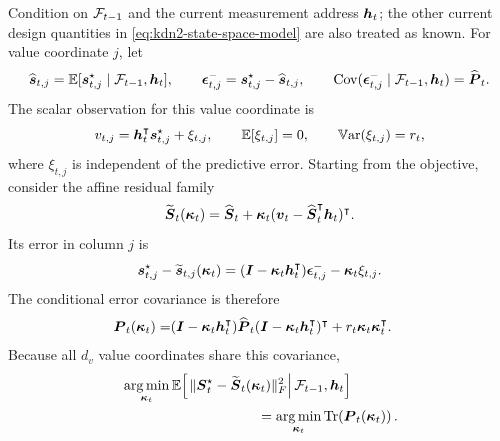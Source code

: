 \documentclass[11pt,letterpaper,logo]{yalearxiv}
\begin{document}
Condition on $\mathcal F_{t-1}$ and the current measurement address $\boldsymbol{h}_t$; the other current design
quantities in \eqref{eq:kdn2-state-space-model} are also treated as known. For value coordinate
$j$, let
\begin{equation}
  \widehat{\boldsymbol{s}}_{t,j}
  =
  \mathbb{E}[\boldsymbol{s}_{t,j}^\star\mid\mathcal F_{t-1},\boldsymbol{h}_t],
  \qquad
  \boldsymbol{\epsilon}_{t,j}^-
  =
  \boldsymbol{s}_{t,j}^\star-\widehat{\boldsymbol{s}}_{t,j},
  \qquad
  \operatorname{Cov}(\boldsymbol{\epsilon}_{t,j}^-\mid\mathcal F_{t-1},\boldsymbol{h}_t)
  =
  \widehat{\boldsymbol{P}}_t.
  \label{eq:app-kdn2-predictive-error}
\end{equation}
The scalar observation for this value coordinate is
\begin{equation}
  v_{t,j}
  =
  \boldsymbol{h}_t^{\intercal}\boldsymbol{s}_{t,j}^\star+\xi_{t,j},
  \qquad
  \mathbb{E}[\xi_{t,j}]=0,
  \qquad
  \mathbb{V}\text{ar}(\xi_{t,j})=r_t,
  \label{eq:app-kdn2-scalar-observation}
\end{equation}
where $\xi_{t,j}$ is independent of the predictive error. Starting from the objective, consider
the affine residual family
\begin{equation}
  \widetilde{\boldsymbol{S}}_t(\boldsymbol{\kappa}_t)
  =
  \widehat{\boldsymbol{S}}_t
  +
  \boldsymbol{\kappa}_t
  (\boldsymbol{v}_t-\widehat{\boldsymbol{S}}_t^{\intercal}\boldsymbol{h}_t)^{\intercal}.
  \label{eq:app-kdn2-candidate-estimator}
\end{equation}
Its error in column $j$ is
\begin{equation}
  \boldsymbol{s}_{t,j}^\star
  -
  \widetilde{\boldsymbol{s}}_{t,j}(\boldsymbol{\kappa}_t)
  =
  (\boldsymbol{I}-\boldsymbol{\kappa}_t\boldsymbol{h}_t^{\intercal})
  \boldsymbol{\epsilon}_{t,j}^-
  -
  \boldsymbol{\kappa}_t\xi_{t,j}.
  \label{eq:app-kdn2-candidate-error}
\end{equation}
The conditional error covariance is therefore
\begin{equation}
\begin{aligned}
  \boldsymbol{P}_t(\boldsymbol{\kappa}_t)
  =
  &(\boldsymbol{I}-\boldsymbol{\kappa}_t\boldsymbol{h}_t^{\intercal})
   \widehat{\boldsymbol{P}}_t
   (\boldsymbol{I}-\boldsymbol{\kappa}_t\boldsymbol{h}_t^{\intercal})^{\intercal}
  +r_t\boldsymbol{\kappa}_t\boldsymbol{\kappa}_t^{\intercal}.
\end{aligned}
\label{eq:app-kdn2-candidate-covariance}
\end{equation}
Because all $d_v$ value coordinates share this covariance,
\begin{equation}
\begin{aligned}
  &\argmin_{\ve{\kappa}_t}
  \E\!\left[
    \left.
    \|\ve{S}_t^\star-
      \widetilde{\ve{S}}_t(\ve{\kappa}_t)\|_F^2
    \right|
    \mc F_{t-1},\ve{h}_t
  \right]\\
  &\hspace{34mm}
  =
  \argmin_{\ve{\kappa}_t}
  \Trace\!\left(\ve{P}_t(\ve{\kappa}_t)\right).
\end{aligned}
\label{eq:app-kdn2-mse-trace-equivalence}
\end{equation}
\end{document}
